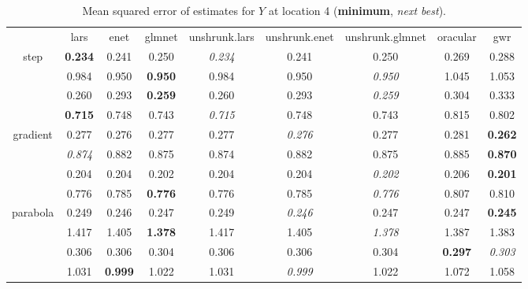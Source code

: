 \documentclass[authoryear, review, 11pt]{elsarticle}
\begin{document}
\begin{table}[ht]
\begin{center}
\begin{tabular}{ccccccccc}
  & lars & enet & glmnet & unshrunk.lars & unshrunk.enet & unshrunk.glmnet & oracular & gwr \\ 
  \cline{2-9}
  \multirow{4}{*}{step} & \textbf{0.234} & 0.241 & 0.250 & \emph{0.234} & 0.241 & 0.250 & 0.269 & 0.288 \\ 
  & 0.984 & 0.950 & \textbf{0.950} & 0.984 & 0.950 & \emph{0.950} & 1.045 & 1.053 \\ 
  & 0.260 & 0.293 & \textbf{0.259} & 0.260 & 0.293 & \emph{0.259} & 0.304 & 0.333 \\ 
  & \textbf{0.715} & 0.748 & 0.743 & \emph{0.715} & 0.748 & 0.743 & 0.815 & 0.802 \\ 
  \cline{2-9}
  \multirow{4}{*}{gradient} & 0.277 & 0.276 & 0.277 & 0.277 & \emph{0.276} & 0.277 & 0.281 & \textbf{0.262} \\ 
  & \emph{0.874} & 0.882 & 0.875 & 0.874 & 0.882 & 0.875 & 0.885 & \textbf{0.870} \\ 
  & 0.204 & 0.204 & 0.202 & 0.204 & 0.204 & \emph{0.202} & 0.206 & \textbf{0.201} \\ 
  & 0.776 & 0.785 & \textbf{0.776} & 0.776 & 0.785 & \emph{0.776} & 0.807 & 0.810 \\ 
  \cline{2-9}
  \multirow{4}{*}{parabola} & 0.249 & 0.246 & 0.247 & 0.249 & \emph{0.246} & 0.247 & 0.247 & \textbf{0.245} \\ 
  & 1.417 & 1.405 & \textbf{1.378} & 1.417 & 1.405 & \emph{1.378} & 1.387 & 1.383 \\ 
  & 0.306 & 0.306 & 0.304 & 0.306 & 0.306 & 0.304 & \textbf{0.297} & \emph{0.303} \\ 
  & 1.031 & \textbf{0.999} & 1.022 & 1.031 & \emph{0.999} & 1.022 & 1.072 & 1.058 \\ 
  \end{tabular}
\caption{Mean squared error of estimates for $Y$ at location 4 (\textbf{minimum}, \emph{next best}).\label{table:loc4-MSEY}}
\end{center}
\end{table}
\end{document}
